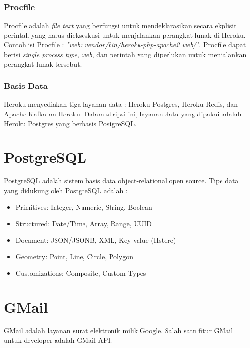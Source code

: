 \subsubsection{Procfile}
Procfile adalah \textit{file text} yang berfungsi untuk mendeklarasikan secara ekplisit perintah yang harus diekseskusi untuk menjalankan perangkat lunak di Heroku. Contoh isi Procfile : \textit{"web: vendor/bin/heroku-php-apache2 web/"}. Procfile dapat berisi \textit{single process type}, \textit{web}, dan perintah yang diperlukan untuk menjalankan perangkat lunak tersebut. \footnotemark[\value{footnote}]

\subsubsection{Basis Data}
Heroku menyediakan tiga layanan data : Heroku Postgres, Heroku Redis, dan Apache Kafka on Heroku. Dalam skripsi ini, layanan data yang dipakai adalah Heroku Postgres yang berbasis PostgreSQL.\footnotemark
{}

\section{PostgreSQL}
\label{sec:PostgreSQL}
PostgreSQL adalah sistem basis data object-relational open source. Tipe data yang didukung oleh PostgreSQL adalah :\footnotemark
{}
\begin{itemize}
\item Primitives: Integer, Numeric, String, Boolean
\item Structured: Date/Time, Array, Range, UUID
\item Document: JSON/JSONB, XML, Key-value (Hstore)
\item Geometry: Point, Line, Circle, Polygon
\item Customizations: Composite, Custom Types
\end{itemize}

\section{GMail}
\label{sec:GMail}
GMail adalah layanan surat elektronik milik Google. Salah satu fitur GMail untuk developer adalah GMail API.
